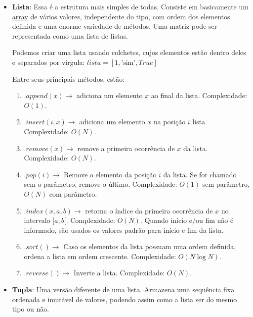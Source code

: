 \documentclass[11pt, a4paper]{article}
\begin{document}
\begin{itemize}
    \item \textbf{Lista}: Essa é a estrutura mais simples de todas. Consiste em basicamente um \href{https://en.wikipedia.org/wiki/Array_(data_structure)}{array} de vários valores, independente do tipo, com ordem dos elementos definida e uma enorme variedade de métodos. Uma matriz pode ser representada como uma lista de listas.

    Podemos criar uma lista usando colchetes, cujos elementos estão dentro deles e separados por vírgula: \(lista = [1,\text{'sim'},True]\)

    Entre seus principais métodos, estão:
    \begin{enumerate}
        \item \(.append(x) \rightarrow\) adiciona um elemento \(x\) ao final da lista. Complexidade: \(O(1)\).

        \item \(.insert(i,x) \rightarrow\) adiciona um elemento \(x\) na posição \(i\) lista. Complexidade: \(O(N)\).

        \item \(.remove(x) \rightarrow\) remove a primeira ocorrência de \(x\) da lista. Complexidade: \(O(N)\).

        \item \(.pop(i) \rightarrow\) Remove o elemento da posição \(i\) da lista. Se for chamado sem o parâmetro, remove o último. Complexidade: \(O(1)\) sem parâmetro, \(O(N)\) com parâmetro.

        \item \(.index(x,a,b) \rightarrow\) retorna o índice da primeira ocorrência de \(x\) no intervalo \([a,b[\). Complexidade: \(O(N)\). Quando início e/ou fim não é informado, são usados os valores padrão para início e fim da lista.

        \item \(.sort() \rightarrow\) Caso os elementos da lista possuam uma ordem definida, ordena a lista em ordem crescente. Complexidade: \(O(N \log N)\).

        \item \(.reverse() \rightarrow\) Inverte a lista. Complexidade: \(O(N)\).
    \end{enumerate}

    \item \textbf{Tupla}: Uma versão diferente de uma lista. Armazena uma sequência fixa ordenada e imutável de valores, podendo assim como a lista ser do mesmo tipo ou não.


\end{itemize}
\end{document}
